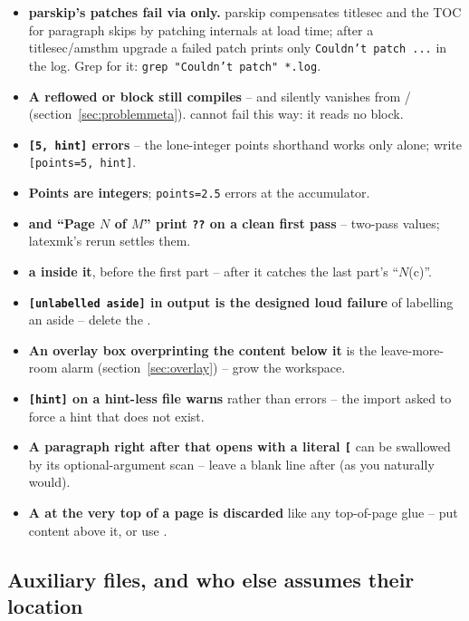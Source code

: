 \begin{itemize}
  \item \textbf{parskip's patches fail via  only.} parskip
    compensates titlesec and the TOC for paragraph skips by patching
    internals at load time; after a titlesec/amsthm upgrade a failed
    patch prints only \texttt{Couldn't patch ...} in the log. Grep for
    it: \texttt{grep "Couldn't patch" *.log}.
  \item \textbf{A reflowed  or  block still
    compiles} -- and silently vanishes from  /
     (section~\ref{sec:problemmeta}). 
    cannot fail this way: it reads no block.
  \item \textbf{\texttt{[5, hint]} errors} -- the lone-integer points
    shorthand works only alone; write \texttt{[points=5, hint]}.
  \item \textbf{Points are integers}; \texttt{points=2.5} errors at the
    accumulator.
  \item \textbf{ and ``Page $N$ of $M$'' print
    \texttt{??} on a clean first pass} -- two-pass values; latexmk's
    rerun settles them.
  \item \textbf{ a  inside it}, before the
    first part -- after  it catches the last part's ``$N$(c)''.
  \item \textbf{\texttt{[unlabelled aside]} in output is the designed
    loud failure} of labelling an aside -- delete the .
  \item \textbf{An overlay box overprinting the content below it} is the
    leave-more-room alarm (section~\ref{sec:overlay}) -- grow the
    workspace.
  \item \textbf{\texttt{[hint]} on a hint-less file warns} rather than
    errors -- the import asked to force a hint that does not exist.
  \item \textbf{A paragraph right after  that opens with a
    literal \texttt{[}} can be swallowed by its optional-argument scan --
    leave a blank line after  (as you naturally would).
  \item \textbf{A  at the very top of a page is discarded}
    like any top-of-page glue -- put content above it, or use
    .
\end{itemize}

\subsection{Auxiliary files, and who else assumes their location}

